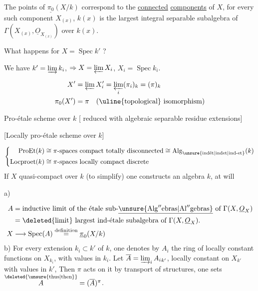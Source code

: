  The points  of $\underline{\pi_0}(X/k)$ correspond to the \uline{connected} \uline{components} of $X$, for every such component $X_{(x)}$, $k(x)$ is the largest integral separable subalgebra of $\Gamma(X_{(x)},\underline{O}_{X_{(x)}})$ over $k(x)$.

What happens for $X=\operatorname{Spec}k'$ ? 

We have $k'=\varinjlim k_i$, $\Rightarrow X=\varprojlim X_i$, $X_i=\operatorname{Spec} k_i$.

\[
\begin{aligned}
X'&=\varprojlim X'_i=\varprojlim_i(\pi_i)_{k}=(\pi)_k\\
\pi_0(X')&=\pi\quad(\text{\uline{topological} isomorphism})
\end{aligned}
\]

Pro-étale scheme over $k$ [   reduced with  algebraic separable residue extensions]

\deleted{\S} [Locally pro-étale scheme over $k$]

\[
\left\{\begin{aligned}
\mathrm{ProEt}(k)&\cong\pi\text{-spaces compact totally disconnected}\cong\mathrm{Alg}_{\text{\unsure{indét|indet|ind-et}}}(k)\\
\mathrm{Locproet}(k)&\cong\pi\text{-spaces locally compact discrete}
\end{aligned}\right.
\]
If $X$ quasi-compact over $k$ (to simplify) one constructs an  algebra  $k$, at will

a)

\[
\begin{aligned}
A&=\text{inductive limit of the étale sub-}\underline{\unsure{\mathrm{Alg}^{\prime\prime}\mathrm{ebras}|\mathrm{Al}''\mathrm{gebras}}}\ \text{of }\Gamma(X,\underline{O}_X)\\
&=\text{\deleted{limit} largest ind-étale subalgebra of }\Gamma(X,\underline{O}_X).\\
X&\longrightarrow\operatorname{Spec}(A)\overset{\text{definition}}{=}\underline{\pi}_0(X/k)
\end{aligned}
\]
b) For every   extension $k_i\subset k'$ of $k$, one denotes by  $A_i$ the ring of locally constant functions on $X_{k_i}$, with values in $k_i$. Let $\overline A=\varinjlim_i {A_i}_{k'}$,    locally constant on $X_{k'}$ with values in $k'$, Then  $\pi$ acts on it by transport of structures, one sets $\overset{\deleted{\unsure{\text{thus}|\text{then}}}}{A}=(\overline A)^\pi$.

